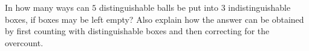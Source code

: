 In how many ways can $5$ distinguishable balls be put into $3$ indistinguishable boxes, if boxes may be left empty? Also explain how the answer can be obtained by first counting with distinguishable boxes and then correcting for the overcount.
